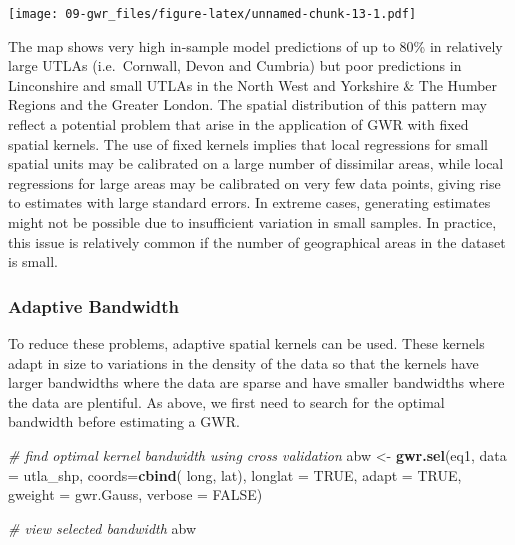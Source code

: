 \documentclass[
]{book}
\newenvironment{Shaded}{\begin{snugshade}}{\end{snugshade}}
\newcommand{\CommentTok}[1]{\textcolor[rgb]{0.56,0.35,0.01}{\textit{#1}}}
\newcommand{\DataTypeTok}[1]{\textcolor[rgb]{0.13,0.29,0.53}{#1}}
\newcommand{\KeywordTok}[1]{\textcolor[rgb]{0.13,0.29,0.53}{\textbf{#1}}}
\newcommand{\NormalTok}[1]{#1}
\newcommand{\OtherTok}[1]{\textcolor[rgb]{0.56,0.35,0.01}{#1}}
\newcommand{\StringTok}[1]{\textcolor[rgb]{0.31,0.60,0.02}{#1}}
\begin{document}
\texttt{[image: 09-gwr\_files/figure-latex/unnamed-chunk-13-1.pdf]}

The map shows very high in-sample model predictions of up to 80\% in relatively large UTLAs (i.e.~Cornwall, Devon and Cumbria) but poor predictions in Linconshire and small UTLAs in the North West and Yorkshire \& The Humber Regions and the Greater London. The spatial distribution of this pattern may reflect a potential problem that arise in the application of GWR with fixed spatial kernels. The use of fixed kernels implies that local regressions for small spatial units may be calibrated on a large number of dissimilar areas, while local regressions for large areas may be calibrated on very few data points, giving rise to estimates with large standard errors. In extreme cases, generating estimates might not be possible due to insufficient variation in small samples. In practice, this issue is relatively common if the number of geographical areas in the dataset is small.

\hypertarget{adaptive-bandwidth}{%
\subsubsection{Adaptive Bandwidth}\label{adaptive-bandwidth}}

To reduce these problems, adaptive spatial kernels can be used. These kernels adapt in size to variations in the density of the data so that the kernels have larger bandwidths where the data are sparse and have smaller bandwidths where the data are plentiful. As above, we first need to search for the optimal bandwidth before estimating a GWR.

\begin{Shaded}
\begin{Highlighting}[]
\CommentTok{# find optimal kernel bandwidth using cross validation}
\NormalTok{abw <-}\StringTok{ }\KeywordTok{gwr.sel}\NormalTok{(eq1, }
               \DataTypeTok{data =}\NormalTok{ utla_shp, }
               \DataTypeTok{coords=}\KeywordTok{cbind}\NormalTok{( long, lat),}
               \DataTypeTok{longlat =} \OtherTok{TRUE}\NormalTok{,}
               \DataTypeTok{adapt =} \OtherTok{TRUE}\NormalTok{, }
               \DataTypeTok{gweight =}\NormalTok{ gwr.Gauss, }
               \DataTypeTok{verbose =} \OtherTok{FALSE}\NormalTok{)}

\CommentTok{# view selected bandwidth}
\NormalTok{abw}
\end{Highlighting}
\end{Shaded}
\end{document}
